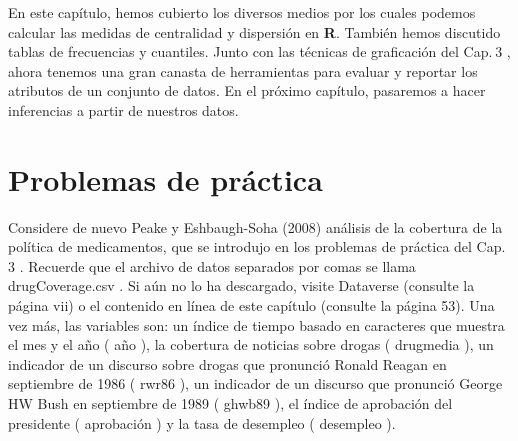 \documentclass[
]{book}
\begin{document}
En este capítulo, hemos cubierto los diversos medios por los cuales podemos calcular las medidas de centralidad y dispersión en \textbf{R}. También hemos discutido tablas de frecuencias y cuantiles. Junto con las técnicas de graficación del Cap. 3 , ahora tenemos una gran canasta de herramientas para evaluar y reportar los atributos de un conjunto de datos. En el próximo capítulo, pasaremos a hacer inferencias a partir de nuestros datos.

\hypertarget{problemas-de-pruxe1ctica-1}{%
\section*{Problemas de práctica}\label{problemas-de-pruxe1ctica-1}}

Considere de nuevo Peake y Eshbaugh-Soha (2008) análisis de la cobertura de la política de medicamentos, que se introdujo en los problemas de práctica del Cap. 3 . Recuerde que el archivo de datos separados por comas se llama drugCoverage.csv . Si aún no lo ha descargado, visite Dataverse (consulte la página vii) o el contenido en línea de este capítulo (consulte la página 53). Una vez más, las variables son: un índice de tiempo basado en caracteres que muestra el mes y el año ( año ), la cobertura de noticias sobre drogas ( drugmedia ), un indicador de un discurso sobre drogas que pronunció Ronald Reagan en septiembre de 1986 ( rwr86 ), un indicador de un discurso que pronunció George HW Bush en septiembre de 1989 ( ghwb89 ), el índice de aprobación del presidente ( aprobación ) y la tasa de desempleo ( desempleo ).
\end{document}
